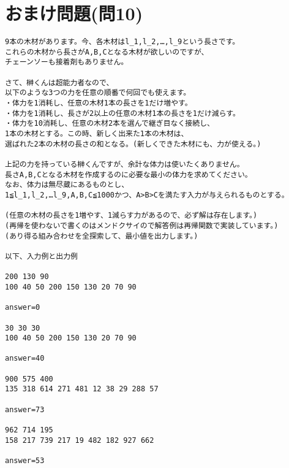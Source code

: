 \section{おまけ問題(問10)}
\begin{verbatim}
9本の木材があります。今、各木材はl_1,l_2,…,l_9という長さです。
これらの木材から長さがA,B,Cとなる木材が欲しいのですが、
チェーンソーも接着剤もありません。

さて、榊くんは超能力者なので、
以下のような3つの力を任意の順番で何回でも使えます。
・体力を1消耗し、任意の木材1本の長さを1だけ増やす。
・体力を1消耗し、長さが2以上の任意の木材1本の長さを1だけ減らす。
・体力を10消耗し、任意の木材2本を選んで継ぎ目なく接続し、
1本の木材とする。この時、新しく出来た1本の木材は、
選ばれた2本の木材の長さの和となる。(新しくできた木材にも、力が使える。)

上記の力を持っている榊くんですが、余計な体力は使いたくありません。
長さA,B,Cとなる木材を作成するのに必要な最小の体力を求めてください。
なお、体力は無尽蔵にあるものとし、
1≦l_1,l_2,…l_9,A,B,C≦1000かつ、A>B>Cを満たす入力が与えられるものとする。

(任意の木材の長さを1増やす、1減らす力があるので、必ず解は存在します。)
(再帰を使わないで書くのはメンドクサイので解答例は再帰関数で実装しています。)
(あり得る組み合わせを全探索して、最小値を出力します。)

以下、入力例と出力例

200 130 90
100 40 50 200 150 130 20 70 90

answer=0

30 30 30
100 40 50 200 150 130 20 70 90

answer=40

900 575 400
135 318 614 271 481 12 38 29 288 57

answer=73

962 714 195
158 217 739 217 19 482 182 927 662

answer=53
\end{verbatim}
